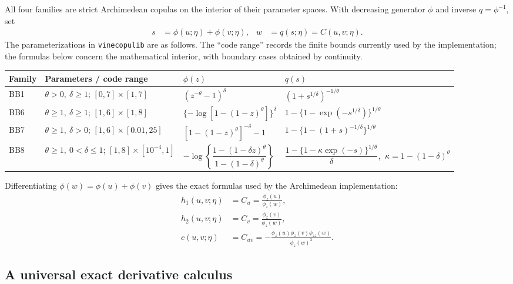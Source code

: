 \documentclass[10pt]{article}
\begin{document}
All four families are strict Archimedean copulas on the interior of their
parameter spaces.  With decreasing generator $\phi$ and inverse $q=\phi^{-1}$,
set
\begin{align*}
s &= \phi(u;\eta)+\phi(v;\eta),
&
w &= q(s;\eta)=C(u,v;\eta).
\end{align*}
The parameterizations in \texttt{vinecopulib} are as follows.  The ``code
range'' records the finite bounds currently used by the implementation; the
formulas below concern the mathematical interior, with boundary cases obtained
by continuity.

\renewcommand{\arraystretch}{1.25}
\begin{center}
\small
\begin{tabularx}{\textwidth}{@{}l>{\raggedright\arraybackslash}p{2.3cm}X X@{}}
\toprule
Family & Parameters / code range & $\phi(z)$ & $q(s)$ \\
\midrule
BB1
& $\theta>0,\ \delta\ge1$; $[0,7]\times[1,7]$
& $(z^{-\theta}-1)^\delta$
& $(1+s^{1/\delta})^{-1/\theta}$ \\
BB6
& $\theta\ge1,\ \delta\ge1$; $[1,6]\times[1,8]$
& $\{-\log[1-(1-z)^\theta]\}^\delta$
& $1-\{1-\exp(-s^{1/\delta})\}^{1/\theta}$ \\
BB7
& $\theta\ge1,\ \delta>0$; $[1,6]\times[0.01,25]$
& $[1-(1-z)^\theta]^{-\delta}-1$
& $1-\{1-(1+s)^{-1/\delta}\}^{1/\theta}$ \\
BB8
& $\theta\ge1,\ 0<\delta\le1$; $[1,8]\times[10^{-4},1]$
& $-\log\!\left\{\dfrac{1-(1-\delta z)^\theta}{1-(1-\delta)^\theta}\right\}$
& $\dfrac{1-\{1-\kappa\exp(-s)\}^{1/\theta}}{\delta}$,
$\ \kappa=1-(1-\delta)^\theta$ \\
\bottomrule
\end{tabularx}
\end{center}

Differentiating $\phi(w)=\phi(u)+\phi(v)$ gives the exact formulas used by the
Archimedean implementation:
\begin{align*}
h_1(u,v;\eta) &= C_u=\frac{\phi_z(u)}{\phi_z(w)},\\
h_2(u,v;\eta) &= C_v=\frac{\phi_z(v)}{\phi_z(w)},\\
c(u,v;\eta) &= C_{uv}
=-\frac{\phi_z(u)\phi_z(v)\phi_{zz}(w)}{\phi_z(w)^3}.
\end{align*}

\subsection{A universal exact derivative calculus}
\end{document}
